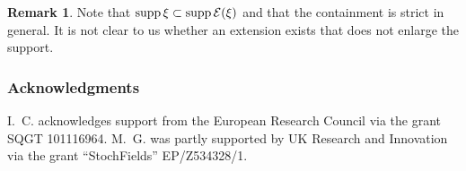 \documentclass[11pt,a4paper]{article}
\numberwithin{equation}{section}
\theoremstyle{definition}
\newtheorem{remark}[theorem]{Remark}
\theoremstyle{remark}
\begin{document}
\begin{remark}
Note that $\operatorname*{supp} \xi\subset\operatorname*{supp}\mathcal{E}(\xi)$ and that the containment is strict in general.
It is not clear to us whether an extension exists that does not enlarge the support. 
\end{remark}

\subsubsection*{Acknowledgments}

I.~C. acknowledges support from the European Research Council via the grant SQGT 101116964.
M.~G. was partly supported by UK Research and Innovation via the grant ``StochFields'' EP/Z534328/1.


{}
\end{document}
